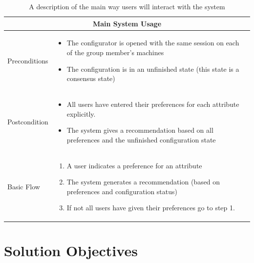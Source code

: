\begin{table}
    \begin{center}
        \begin{tabularx}{\columnwidth}{l|X}
            \multicolumn{2}{c}{Main System Usage} \\
            \hline
            Preconditions   & 
                \begin{itemize}
                    \item The configurator is opened with the same session on each of the group member's machines
                    \item The configuration is in an unfinished state (this state is a consensus state)
                \end{itemize} \\
            \hline
            Postcondition   & 
                \begin{itemize}
                    \item All users have entered their preferences for each attribute explicitly.
                    \item The system gives a recommendation based on all preferences and the unfinished configuration state
                \end{itemize} \\
            \hline
            Basic Flow      & 
                \begin{enumerate}
                    \item A user indicates a preference for an attribute
                    \item The system generates a recommendation (based on preferences and configuration status)
                    \item If not all users have given their preferences go to step 1.
                \end{enumerate} \\
            \hline
        \end{tabularx}
        \caption{A description of the main way users will interact with the system}
        \label{tab:Concept:MainUseCase}
    \end{center}
\end{table}

\FloatBarrier

\section{Solution Objectives}
\label{sec:Concept:SolutionObjectives}

